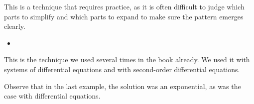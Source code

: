 This is a technique that requires practice, as it is often difficult to judge which parts to simplify and which parts to expand to make sure the pattern emerges clearly. \\

\begin{video}
\begin{itemize}
	\item {}
\end{itemize}	
\end{video}






This is the technique we used several times in the book already. We used it with systems of differential equations and with second-order differential equations.

Observe that in the last example, the solution was an exponential, as was the case with differential equations.

